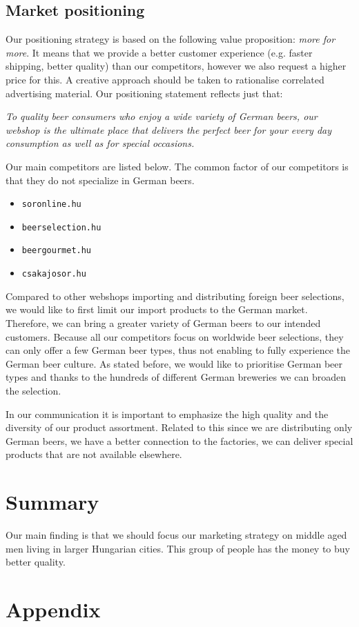 \subsection{Market positioning}


Our positioning strategy is based on the following value proposition:  \textit{more for more}. It means that we provide a better customer experience (e.g. faster shipping, better quality) than our competitors, however we also request a higher price for this. A creative approach should be taken to rationalise correlated advertising material. Our positioning statement reflects just that:

\textit{To quality beer consumers who enjoy a wide variety of German beers, our webshop is the ultimate place that delivers the perfect beer for your every day consumption as well as for special occasions.}



Our main competitors are listed below. The common factor of our competitors is that they do not specialize in German beers.
\begin{itemize}
   \item \texttt{soronline.hu} \cite{soronline}
   \item \texttt{beerselection.hu} \cite{beerselection}
   \item \texttt{beergourmet.hu} \cite{beergourmet}
   \item \texttt{csakajosor.hu} \cite{csakajosor}
\end{itemize}
Compared to other webshops importing and distributing foreign beer selections, we would like to first limit our import products to the German market. Therefore, we can bring a greater variety of German beers to our intended customers. Because all our competitors focus on worldwide beer selections, they can only offer a few German beer types, thus not enabling to fully experience the German beer culture. As stated before, we would like to prioritise German beer types and thanks to the hundreds of different German breweries we can broaden the selection.

In our communication it is important to emphasize the high quality and the diversity of our product assortment. Related to this since we are distributing only German beers, we have a better connection to the factories, we can deliver special products that are not available elsewhere.


\section{Summary}
Our main finding is that we should focus our marketing strategy on middle aged men living in larger Hungarian cities. This group of people has the money to buy better quality.


\newpage

\section{Appendix}



